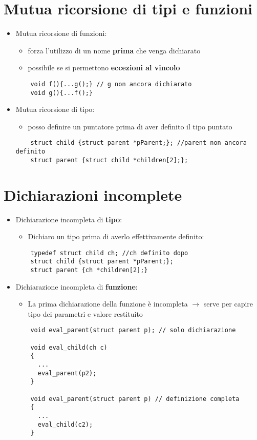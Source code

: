 \documentclass{article}
\begin{document}
\section*{Mutua ricorsione di tipi e funzioni}
\begin{itemize}
  \item Mutua ricorsione di funzioni:
  \begin{itemize}
    \item forza l'utilizzo di un nome \textbf{prima} che venga dichiarato
    \item possibile se si permettono \textbf{eccezioni al vincolo}
  \end{itemize}
  \begin{lstlisting}
    void f(){...g();} // g non ancora dichiarato
    void g(){...f();}
  \end{lstlisting}
  \item Mutua ricorsione di tipo:
  \begin{itemize}
    \item posso definire un puntatore prima di aver definito il tipo puntato
  \end{itemize}
  \begin{lstlisting}
    struct child {struct parent *pParent;}; //parent non ancora definito
    struct parent {struct child *children[2];};
  \end{lstlisting}
\end{itemize}

\section*{Dichiarazioni incomplete}
\begin{itemize}
  \item Dichiarazione incompleta di \textbf{tipo}:
  \begin{itemize}
    \item Dichiaro un tipo prima di averlo effettivamente definito:
  \end{itemize}
  \begin{lstlisting}
    typedef struct child ch; //ch definito dopo
    struct child {struct parent *pParent;};
    struct parent {ch *children[2];}
  \end{lstlisting}
  \item Dichiarazione incompleta di \textbf{funzione}:
  \begin{itemize}
    \item La prima dichiarazione della funzione è incompleta $\rightarrow$ serve per capire tipo dei parametri e valore restituito
  \end{itemize}
  \begin{lstlisting}
    void eval_parent(struct parent p); // solo dichiarazione
    
    void eval_child(ch c)
    {
      ...
      eval_parent(p2);
    }

    void eval_parent(struct parent p) // definizione completa
    { 
      ...
      eval_child(c2);
    }
  \end{lstlisting}
\end{itemize}
\end{document}
